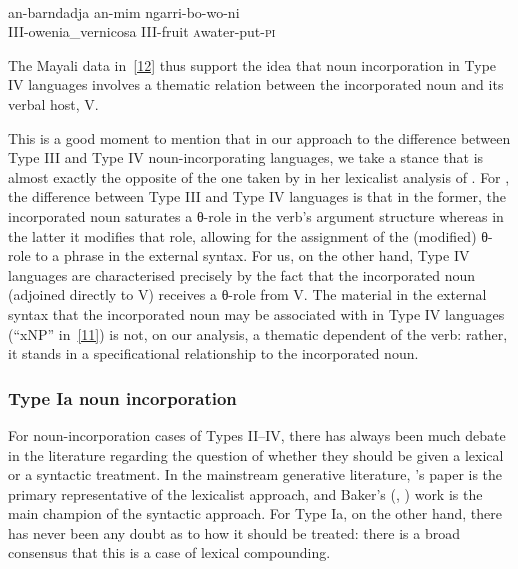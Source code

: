 \documentclass[output=paper]{langsci/langscibook}
\newcommand{\posscite}[1]{\citeauthor{#1}'s \citeyearpar{#1}}
\begin{document}
\begin{refcontext}
{\begin{exe}
     \\
    \gll an-barndadja an-mim ngarri-bo-wo-ni\label{i}\\
    III-owenia\_vernicosa III-fruit \First\textsc{a}\normalfont{-}water-put-\textsc{pi}\\
\end{exe}} The Mayali data in~\eqref{12} thus support the idea that noun
incorporation in Type IV languages involves a thematic relation between the
incorporated noun and its verbal host, V.

This is a good moment to mention that in our approach to the difference between Type III
and Type IV noun-incorporating languages, we take a stance that is almost exactly the opposite of
the one taken by \citet{rosen89} in her lexicalist analysis of . For \citet{rosen89},
the difference between Type III and Type IV languages is that in the former, the incorporated noun
saturates a θ-role in the verb's argument structure whereas in the latter it modifies that role, allowing
for the assignment of the (modified) θ-role to a phrase in the external syntax. For us, on the other
hand, Type IV languages are characterised precisely by the fact that the incorporated noun (adjoined
directly to V) receives a θ-role from V. The material in the external syntax that the incorporated noun
may be associated with in Type IV languages (\enquote{xNP} in~\ref{11}) is not, on our analysis, a thematic
dependent of the verb: rather, it stands in a specificational relationship to the incorporated noun.

\subsubsection{Type Ia noun incorporation}
For noun-incorporation cases of Types II–IV, there has always been much debate in the literature
regarding the question of whether they should be given a lexical or a syntactic treatment. In the mainstream
generative literature, \posscite{rosen89} paper is the primary representative of the lexicalist
approach, and Baker’s (\citeyear{baker88}, \citeyear{baker96}) work is the main champion of the syntactic approach. For Type
Ia, on the other hand, there has never been any doubt as to how it should be treated: there is a broad
consensus that this is a case of lexical compounding.


\end{refcontext}
\end{document}
